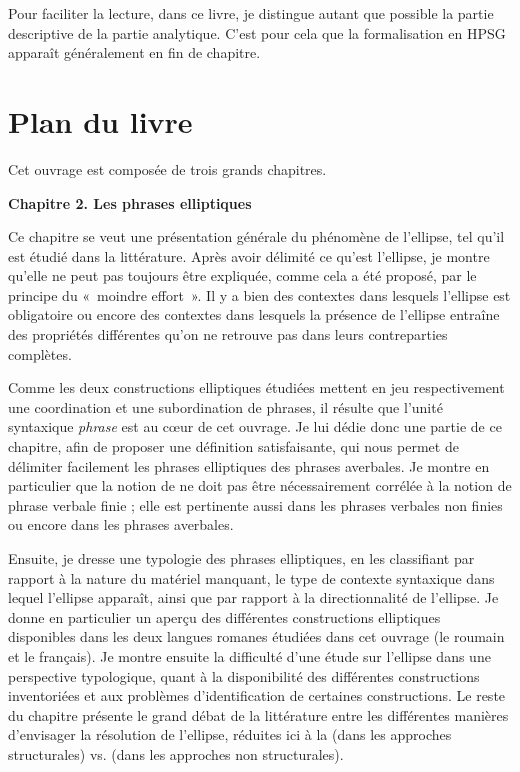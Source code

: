 Pour faciliter la lecture, dans ce livre, je distingue autant que possible la partie descriptive de la partie analytique. C’est pour cela que la formalisation en HPSG apparaît généralement en fin de chapitre. 



\section{Plan du livre}



Cet ouvrage est composée de trois grands chapitres.  \newline

\textbf{Chapitre 2. Les phrases elliptiques} 

Ce chapitre se veut une présentation générale du phénomène de l’ellipse, tel qu’il est étudié dans la littérature. Après avoir délimité ce qu’est l’ellipse, je montre qu’elle ne peut pas toujours être expliquée, comme cela a été proposé, par le principe du «~moindre effort~». Il y a bien des contextes dans lesquels l’ellipse est obligatoire ou encore des contextes dans lesquels la présence de l’ellipse entraîne des propriétés différentes qu’on ne retrouve pas dans leurs contreparties complètes. 



Comme les deux constructions elliptiques étudiées mettent en jeu respectivement une coordination et une subordination de phrases, il résulte que l’unité syntaxique \textit{phrase} est au cœur de cet ouvrage. Je lui dédie donc une partie de ce chapitre, afin de proposer une définition satisfaisante, qui nous permet de délimiter facilement les phrases elliptiques des phrases averbales. Je montre en particulier que la notion de  ne doit pas être nécessairement corrélée à la notion de phrase verbale finie ; elle est pertinente aussi dans les phrases verbales non finies ou encore dans les phrases averbales. 



Ensuite, je dresse une typologie des phrases elliptiques, en les classifiant par rapport à la nature du matériel manquant, le type de contexte syntaxique dans lequel l’ellipse apparaît, ainsi que par rapport à la directionnalité de l’ellipse. Je donne en particulier un aperçu des différentes constructions elliptiques disponi\-bles dans les deux langues romanes étudiées dans cet ouvrage (le roumain et le français). Je montre ensuite la difficulté d’une étude sur l’ellipse dans une perspective typologique, quant à la disponibilité des différentes constructions inventoriées et aux problèmes d’identification de certaines constructions. Le reste du chapitre présente le grand débat de la littérature entre les différentes manières d’envisager la résolution de l’ellipse, réduites ici à la  (dans les approches structurales) vs.  (dans les approches non structurales). \newline



